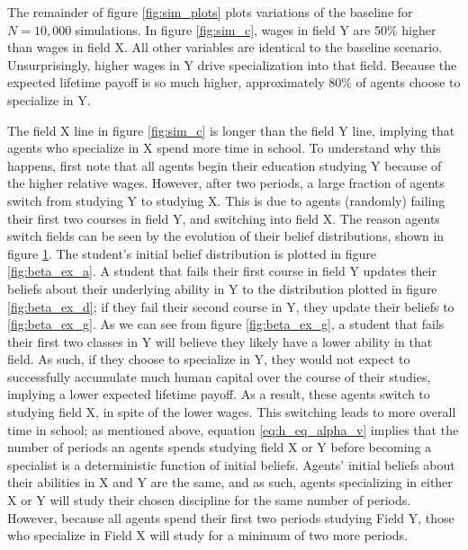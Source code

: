 \documentclass[11 pt]{article}
\newcommand{\toedit}[1]{{\color{gray}#1}}
\newcommand{\toedit}[1]{#1}
\begin{document}
\begin{figure}[t!]
\centering

\label{fig:beta_change}
\end{figure}

The remainder of figure \ref{fig:sim_plots} plots variations of the baseline for $N = 10,000$ simulations.
In figure \ref{fig:sim_c}, wages in field Y are 50\% higher than wages in field X. 
All other variables are identical to the baseline scenario. 
Unsurprisingly, higher wages in Y drive specialization into that field.
Because the expected lifetime payoff is so much higher, approximately 80\% of agents choose to specialize in Y.

The field X line in figure \ref{fig:sim_c} is longer than the field Y line, implying that agents who specialize in X spend more time in school.
To understand why this happens, first note that all agents begin their education studying Y because of the higher relative wages. 
However, after two periods, a large fraction of agents switch from studying Y to studying X. 
\toedit{This is due to agents (randomly) failing their first two courses in field Y, and switching into field X.}
The reason agents switch fields can be seen by the evolution of their belief distributions, shown in figure \ref{fig:beta_change}.
The student's initial belief distribution is plotted in figure \ref{fig:beta_ex_a}.
A student that fails their first course in field Y updates their beliefs about their underlying ability in Y to the distribution plotted in figure \ref{fig:beta_ex_d}; if they fail their second course in Y, they update their beliefs to \ref{fig:beta_ex_g}.
As we can see from figure \ref{fig:beta_ex_g}, a student that fails their first two classes in Y will believe they likely have a lower ability in that field.
As such, if they choose to specialize in Y, they would not expect to successfully accumulate much human capital over the course of their studies, implying a lower expected lifetime payoff.
As a result, these agents switch to studying field X, in spite of the lower wages.
This switching leads to more overall time in school; as mentioned above, equation \eqref{eq:h_eq_alpha_v} implies that the number of periods an agents spends studying field X or Y before becoming a specialist is a deterministic function of initial beliefs. 
Agents' initial beliefs about their abilities in X and Y are the same, and as such, agents specializing in either X or Y will study their chosen discipline for the same number of periods. 
However, because all agents spend their first two periods studying Field Y, those who specialize in Field X will study for a minimum of two more periods.
\end{document}
